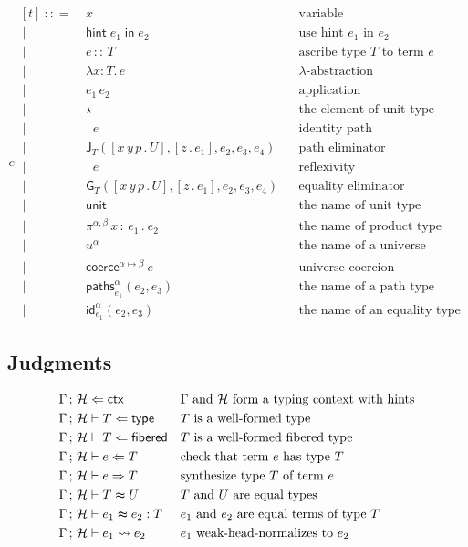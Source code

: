 \documentclass{article}
\newcommand{\G}{\Gamma} %
\newcommand{\T}{T} %
\newcommand{\U}{U} %
\newcommand{\x}{x} %
\newcommand{\e}{e} %
\newcommand{\bnf}{\ \mathrel{{:}{:}{=}}\ }
\newcommand{\bnfor}{\ \mid\ \ }
\newcommand{\lam}[2]{\lambda #1 {:} #2 .\,} %
\newcommand{\app}[2]{#1\,#2} %
\newcommand{\abst}[2]{[#1 \,.\, #2]} %
\newcommand{\ascribe}[2]{#1 \,{:}{:}\, #2} %
\newcommand{\unitTerm}{\star} %
\newcommand{\coerce}[3]{\mathsf{coerce}^{#2{\mapsto}#3}\ #1}
\newcommand{\PrElim}[6]{\mathsf{J}_{#1}(#2, #3, #4, #5, #6)} %
\newcommand{\JuElim}[6]{\mathsf{G}_{#1}(#2, #3, #4, #5, #6)} %
\newcommand{\prRefl}[1]{\mathop{\mathsf{idpath}_{#1}}}  %
\newcommand{\juRefl}[1]{\mathop{\mathsf{refl}_{#1}}}    %
\newcommand{\nUnit}{\mathsf{unit}} %
\newcommand{\nProd}[3]{\pi^{#1} \,#2\,{:}\,#3 \,.\ } %
\newcommand{\nUniverse}[1]{u^{#1}}  %
\newcommand{\nPrEqual}[4]{\mathsf{paths}^{#1}_{#2}(#3,#4)} %
\newcommand{\nJuEqual}[4]{\mathsf{id}^{#1}_{#2}(#3,#4)} %
\newcommand{\chkterm}[3]{#1 \vdash #2 \Leftarrow #3} %
\newcommand{\synterm}[3]{#1 \vdash #2 \Rightarrow #3} %
\newcommand{\hintin}[1]{\mathsf{hint}\;#1\;\mathsf{in}\;} %
\newcommand{\isctxalg}[2]{\ctxs{#1}{#2} \Leftarrow \mathsf{ctx}}
\newcommand{\istypealg}[2]{#1 \vdash #2 \Leftarrow \mathsf{type}} %
\newcommand{\isfibalg}[2]{#1 \vdash #2 \Leftarrow \mathsf{fibered}} %
\newcommand{\eqtypealg}[3]{#1 \vdash #2 \thickapprox #3} %
\newcommand{\eqtermalg}[4]{#1 \vdash #2 \thickapprox #3 : #4} %
\renewcommand{\H}{\mathcal{H}}      %
\newcommand{\ctxs}[2]{#1\,;\,#2}
\newcommand{\GH}{\ctxs{\G}{\H}}           %
\newcommand{\whnf}[3]{#1 \vdash #2 \leadsto #3 } %
\begin{document}
\begin{equation*}
  \e
  \begin{aligned}[t]
    \bnf   {}&  \x   &&\text{variable} \\
    \bnfor {}&  \hintin{\e_1} e_2 &&\text{use hint $\e_1$ in $\e_2$} \\
    \bnfor {}&  \ascribe{\e}{\T}  &&\text{ascribe type $\T$ to term $\e$} \\
    \bnfor {}&  \lam{\x}{\T} \e  &&\text{$\lambda$-abstraction} \\
    \bnfor {}&   \app{\e_1}{\e_2}  &&\text{application} \\
    \bnfor {}&  \unitTerm  &&\text{the element of unit type} \\
    \bnfor {}&  \prRefl{\T}{\e}  &&\text{identity path} \\
    \bnfor {}&  \PrElim{\T}{\abst{x\,y\,p}{\U}}{\abst{z}{\e_1}}{\e_2}{\e_3}{\e_4}  &&\text{path eliminator} \\
    \bnfor {}&  \juRefl{\T}{\e}  &&\text{reflexivity} \\
    \bnfor {}&  \JuElim{\T}{\abst{x\,y\,p}{\U}}{\abst{z}{\e_1}}{\e_2}{\e_3}{\e_4}  &&\text{equality eliminator} \\
    \bnfor {}&  \nUnit  &&\text{the name of unit type} \\
    \bnfor {}&  \nProd{\alpha,\beta}{\x}{\e_1} \e_2  &&\text{the name of product type} \\
    \bnfor {}&  \nUniverse{\alpha} &&\text{the name of a universe} \\
    \bnfor {}&  \coerce{\e}{\alpha}{\beta}  &&\text{universe coercion} \\
    \bnfor {}&  \nPrEqual{\alpha}{\e_1}{\e_2}{\e_3}  &&\text{the name of a path type} \\
    \bnfor {}&  \nJuEqual{\alpha}{\e_1}{\e_2}{\e_3}  &&\text{the name of an equality type}
  \end{aligned}
\end{equation*}

\subsection{Judgments}
\label{sec:bidirectional-judgments}

\begin{align*}
& \isctxalg{\G}{\H} & & \text{$\G$ and $\H$ form a typing context with hints} \\
& \istypealg{\GH}{\T} & & \text{$\T$ is a well-formed type} \\
& \isfibalg{\GH}{\T} & & \text{$\T$ is a well-formed fibered type} \\
& \chkterm{\GH}{\e}{\T} & & \text{check that term $\e$ has type $T$} \\
& \synterm{\GH}{\e}{\T} & & \text{synthesize type $\T$ of term $e$} \\
& \eqtypealg{\GH}{\T}{\U} & & \text{$\T$ and $\U$ are equal types} \\
& \eqtermalg{\GH}{\e_1}{\e_2}{\T} & & \text{$\e_1$ and $\e_2$ are equal terms of type $\T$} \\
& \whnf{\GH}{\e_1}{\e_2} & & \text{$\e_1$ weak-head-normalizes to $\e_2$ }
\end{align*}
\end{document}
